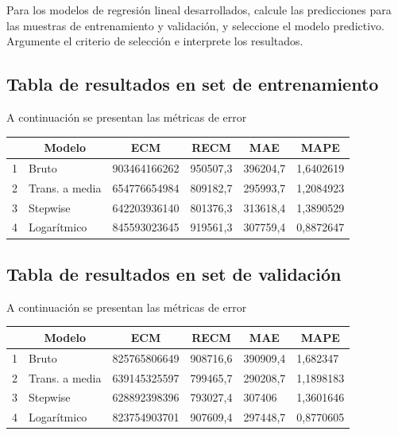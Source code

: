 \documentclass[
	11pt, %
	spanish, %
]{fphw}
\begin{document}
\begin{problem}

Para los modelos de regresión lineal desarrollados, calcule las predicciones para las muestras de entrenamiento y validación, y seleccione el modelo predictivo. Argumente el criterio de selección e interprete los resultados.

\end{problem}

\subsection*{Tabla de resultados en set de entrenamiento}
A continuación se presentan las métricas de error

\begin{table}[h!]
\centering
\label{tab:metricas_train}
\begin{tabular}{llllll}
\hline
\multicolumn{1}{c}{\textbf{}} & \multicolumn{1}{c}{\textbf{Modelo}} & \multicolumn{1}{c}{\textbf{ECM}} & \multicolumn{1}{c}{\textbf{RECM}} & \multicolumn{1}{c}{\textbf{MAE}} & \multicolumn{1}{c}{\textbf{MAPE}} \\ \hline
1 & Bruto & 903464166262 & 950507,3 & 396204,7 & 1,6402619 \\
2 & Trans. a media & 654776654984 & 809182,7 & 295993,7 & 1,2084923 \\
3 & Stepwise & 642203936140 & 801376,3 & 313618,4 & 1,3890529 \\
4 & Logarítmico & 845593023645 & 919561,3 & 307759,4 & 0,8872647
\end{tabular}
\end{table}

\subsection*{Tabla de resultados en set de validación}
A continuación se presentan las métricas de error
\begin{table}[h!]
\centering
\label{tab:my-table}
\begin{tabular}{llllll}
\hline
 & \multicolumn{1}{c}{\textbf{Modelo}} & \multicolumn{1}{c}{\textbf{ECM}} & \multicolumn{1}{c}{\textbf{RECM}} & \multicolumn{1}{c}{\textbf{MAE}} & \multicolumn{1}{c}{\textbf{MAPE}} \\ \hline
1 & Bruto & 825765806649 & 908716,6 & 390909,4 & 1,682347 \\
2 & Trans. a media & 639145325597 & 799465,7 & 290208,7 & 1,1898183 \\
3 & Stepwise & 628892398396 & 793027,4 & 307406 & 1,3601646 \\
4 & Logarítmico & 823754903701 & 907609,4 & 297448,7 & 0,8770605
\end{tabular}
\end{table}
\end{document}
